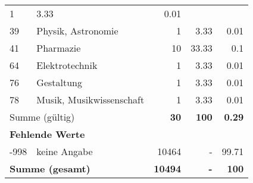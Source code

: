 \begin{longtable}{lXrrr}
       \num{1} &
       \num[round-mode=places,round-precision=2]{3,33} &
         \num[round-mode=places,round-precision=2]{0,01} \\

     39 &
     \multicolumn{1}{X}{ Physik, Astronomie   } &


       \num{1} &
       \num[round-mode=places,round-precision=2]{3,33} &
         \num[round-mode=places,round-precision=2]{0,01} \\

     41 &
     \multicolumn{1}{X}{ Pharmazie   } &


       \num{10} &
       \num[round-mode=places,round-precision=2]{33,33} &
         \num[round-mode=places,round-precision=2]{0,1} \\

     64 &
     \multicolumn{1}{X}{ Elektrotechnik   } &


       \num{1} &
       \num[round-mode=places,round-precision=2]{3,33} &
         \num[round-mode=places,round-precision=2]{0,01} \\

     76 &
     \multicolumn{1}{X}{ Gestaltung   } &


       \num{1} &
       \num[round-mode=places,round-precision=2]{3,33} &
         \num[round-mode=places,round-precision=2]{0,01} \\

     78 &
     \multicolumn{1}{X}{ Musik, Musikwissenschaft   } &


       \num{1} &
       \num[round-mode=places,round-precision=2]{3,33} &
         \num[round-mode=places,round-precision=2]{0,01} \\
     \midrule
     \multicolumn{2}{l}{Summe (gültig)} &
       \textbf{\num{30}} &
     \textbf{100} &
       \textbf{\num[round-mode=places,round-precision=2]{0,29}} \\
     \multicolumn{5}{l}{\textbf{Fehlende Werte}}\\
       -998 &
       keine Angabe &
         \num{10464} &
        - &
         \num[round-mode=places,round-precision=2]{99,71} \\
     \midrule
     \multicolumn{2}{l}{\textbf{Summe (gesamt)}} &
          \textbf{\num{10494}} &
        \textbf{-} &
        \textbf{100} \\
     \bottomrule
     \end{longtable}
     
